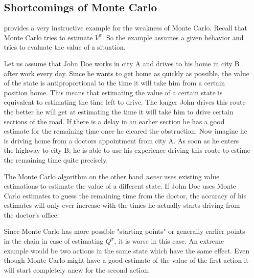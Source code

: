 \subsection{Shortcomings of Monte Carlo}
\citeauthor{suttonReinforcementLearningIntroduction2018a} provides a very instructive example for the weakness of Monte Carlo. Recall that Monte Carlo tries to estimate \(V^\pi\). So the example assumes a given behavior and tries to evaluate the value of a situation.

\begin{example}
	Let us assume that John Doe works in city A and drives to his home in city B after work every day. Since he wants to get home as quickly as possible, the value of the state is antiproportional to the time it will take him from a certain position home. This means that estimating the value of a certain state is equivalent to estimating the time left to drive. The longer John drives this route the better he will get at estimating the time it will take him to drive certain sections of the road. If there is a delay in an earlier section he has a good estimate for the remaining time once he cleared the obstruction. Now imagine he is driving home from a doctors appointment from city A. As soon as he enters the highway to city B, he is able to use his experience driving this route to estime the remaining time quite precisely.

	The Monte Carlo algorithm on the other hand \emph{never} uses existing value estimations to estimate the value of a different state. If John Doe uses Monte Carlo estimates to guess the remaining time from the doctor, the accuracy of his estimates will only ever increase with the times he actually starts driving from the doctor's office. 
\end{example}

Since Monte Carlo has more possible "starting points" or generally earlier points in the chain in case of estimating \(Q^\pi\), it is worse in this case. An extreme example would be two actions in the same state which have the same effect. Even though Monte Carlo might have a good estimate of the value of the first action it will start completely anew for the second action. 

